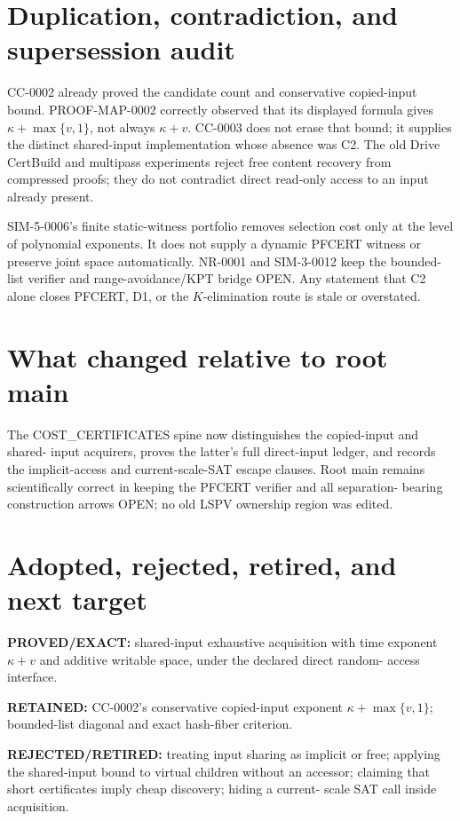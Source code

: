 \documentclass[11pt]{article}
\begin{document}
\section{Duplication, contradiction, and supersession audit}
CC-0002 already proved the candidate count and conservative copied-input
bound.  PROOF-MAP-0002 correctly observed that its displayed formula gives
$\kappa+\max\{v,1\}$, not always $\kappa+v$.  CC-0003 does not erase that
bound; it supplies the distinct shared-input implementation whose absence
was C2.  The old Drive CertBuild and multipass experiments reject free
content recovery from compressed proofs; they do not contradict direct
read-only access to an input already present.

SIM-5-0006's finite static-witness portfolio removes selection cost only at
the level of polynomial exponents.  It does not supply a dynamic PFCERT
witness or preserve joint space automatically.  NR-0001 and SIM-3-0012 keep
the bounded-list verifier and range-avoidance/KPT bridge OPEN.  Any statement
that C2 alone closes PFCERT, D1, or the $K$-elimination route is stale or
overstated.

\section{What changed relative to root main}
The COST\_CERTIFICATES spine now distinguishes the copied-input and shared-
input acquirers, proves the latter's full direct-input ledger, and records
the implicit-access and current-scale-SAT escape clauses.  Root main remains
scientifically correct in keeping the PFCERT verifier and all separation-
bearing construction arrows OPEN; no old LSPV ownership region was edited.

\section{Adopted, rejected, retired, and next target}
\textbf{PROVED/EXACT:} shared-input exhaustive acquisition with time exponent
$\kappa+v$ and additive writable space, under the declared direct random-
access interface.

\textbf{RETAINED:} CC-0002's conservative copied-input exponent
$\kappa+\max\{v,1\}$; bounded-list diagonal and exact hash-fiber criterion.

\textbf{REJECTED/RETIRED:} treating input sharing as implicit or free;
applying the shared-input bound to virtual children without an accessor;
claiming that short certificates imply cheap discovery; hiding a current-
scale SAT call inside acquisition.
\end{document}
